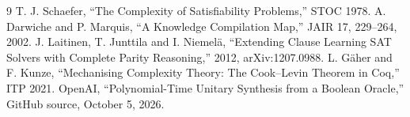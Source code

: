 \documentclass[11pt]{article}
\begin{document}
\begin{thebibliography}{9}
 T. J. Schaefer, ``The Complexity of Satisfiability Problems,'' STOC 1978.
 A. Darwiche and P. Marquis, ``A Knowledge Compilation Map,'' JAIR 17, 229--264, 2002.
 J. Laitinen, T. Junttila and I. Niemel\"a, ``Extending Clause Learning SAT Solvers with Complete Parity Reasoning,'' 2012, arXiv:1207.0988.
 L. G\"aher and F. Kunze, ``Mechanising Complexity Theory: The Cook--Levin Theorem in Coq,'' ITP 2021.
 OpenAI, ``Polynomial-Time Unitary Synthesis from a Boolean Oracle,'' GitHub source, October 5, 2026.
\end{thebibliography}
\end{document}

